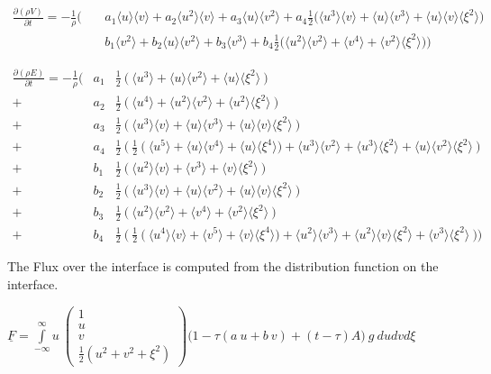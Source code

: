 \documentclass[
	pdftex,             %
	12pt,				%
	a4paper,		   	%
	english,				%
	oneside,			%
]{article}
\newcommand{\mom}[1]{\langle #1 \rangle}
\newcommand{\uu}[1]{\underline{#1}}
\begin{document}
\begin{eqnarray*}
\frac{\partial (\rho V)}{\partial t}
=
-\frac{1}{\rho}
\Bigg(
&~&a_1 \mom{u}\mom{v} + a_2 \mom{u^2}\mom{v} + a_3 \mom{u}\mom{v^2}
+  a_4 \frac{1}{2} \Big( \mom{u^3}\mom{v} + \mom{u}\mom{v^3} + \mom{u}\mom{v}\mom{\xi^2} \Big)
\\
&~&b_1 \mom{v^2} + b_2 \mom{u}\mom{v^2} + b_3 \mom{v^3}
+  b_4 \frac{1}{2} \Big( \mom{u^2}\mom{v^2} + \mom{v^4} + \mom{v^2}\mom{\xi^2} \Big)
\Bigg)
\end{eqnarray*}

\begin{eqnarray*}
\frac{\partial (\rho E)}{\partial t}
=
-\frac{1}{\rho}
\Bigg(
 &a_1& \frac{1}{2}~ \Big(~ \mom{u^3} + \mom{u}\mom{v^2} + \mom{u}\mom{\xi^2} ~\Big) \\
+&a_2& \frac{1}{2}~ \Big(~ \mom{u^4} + \mom{u^2}\mom{v^2} + \mom{u^2}\mom{\xi^2} ~\Big) \\
+&a_3& \frac{1}{2}~ \Big(~ \mom{u^3}\mom{v} + \mom{u}\mom{v^3} + \mom{u}\mom{v}\mom{\xi^2} ~\Big) \\
+&a_4& \frac{1}{2}~ \Big(~ \frac{1}{2}~
					\big(~ \mom{u^5} + \mom{u}\mom{v^4} + \mom{u}\mom{\xi^4} \big)
						 + \mom{u^3}\mom{v^2} + \mom{u^3}\mom{\xi^2} + \mom{u}\mom{v^2}\mom{\xi^2}
					~\Big)
\\
+&b_1& \frac{1}{2}~ \Big(~ \mom{u^2}\mom{v} + \mom{v^3} + \mom{v}\mom{\xi^2} ~\Big) \\
+&b_2& \frac{1}{2}~ \Big(~ \mom{u^3}\mom{v} + \mom{u}\mom{v^2} + \mom{u}\mom{v}\mom{\xi^2} ~\Big) \\
+&b_3& \frac{1}{2}~ \Big(~ \mom{u^2}\mom{v^2} + \mom{v^4} + \mom{v^2}\mom{\xi^2} ~\Big) \\
+&b_4& \frac{1}{2}~ \Big(~ \frac{1}{2}~
					\big(~  \mom{u^4}\mom{v} +\mom{v^5} + \mom{v}\mom{\xi^4} \big)
						 + \mom{u^2}\mom{v^3} + \mom{u^2}\mom{v}\mom{\xi^2} + \mom{v^3}\mom{\xi^2}
					~\Big)
\Bigg)
\end{eqnarray*}

\clearpage

The Flux over the interface is computed from the distribution function on the interface. 

\begin{math}
\uu{F} = 
\int \limits_{-\infty}^{\infty}
u~
\begin{pmatrix}
	1 \\ u \\ v \\ \frac{1}{2} (u^2 + v^2 + \xi^2)
\end{pmatrix}
\Big(
	1 - \tau (a~u + b~v) + (t-\tau)A
\Big)
~g~ du dv d\xi
\end{math}
\end{document}
